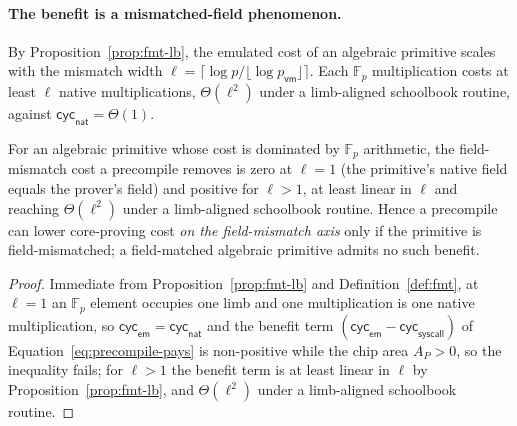 \paragraph{The benefit is a mismatched-field phenomenon.} By Proposition~\ref{prop:fmt-lb}, the emulated cost of an algebraic primitive scales with the mismatch width $\ell=\lceil\log p/\lfloor\log p_{\mathsf{vm}}\rfloor\rceil$. Each $\mathbb{F}_p$ multiplication costs at least $\ell$ native multiplications, $\Theta(\ell^2)$ under a limb-aligned schoolbook routine, against $\mathsf{cyc}_{\mathsf{nat}}=\Theta(1)$.

\begin{proposition}\label{prop:field-match}
For an algebraic primitive whose cost is dominated by $\mathbb{F}_p$ arithmetic, the field-mismatch cost a precompile removes is zero at $\ell=1$ (the primitive's native field equals the prover's field) and positive for $\ell>1$, at least linear in $\ell$ and reaching $\Theta(\ell^2)$ under a limb-aligned schoolbook routine. Hence a precompile can lower core-proving cost \emph{on the field-mismatch axis} only if the primitive is field-mismatched; a field-matched algebraic primitive admits no such benefit.
\end{proposition}

\begin{proof} 
Immediate from Proposition~\ref{prop:fmt-lb} and Definition~\ref{def:fmt}, at $\ell=1$ an $\mathbb{F}_p$ element occupies one limb and one multiplication is one native multiplication, so $\mathsf{cyc}_{\mathsf{em}}=\mathsf{cyc}_{\mathsf{nat}}$ and the benefit term $(\mathsf{cyc}_{\mathsf{em}}-\mathsf{cyc}_{\mathsf{syscall}})$ of Equation~\eqref{eq:precompile-pays} is non-positive while the chip area $A_P>0$, so the inequality fails; for $\ell>1$ the benefit term is at least linear in $\ell$ by Proposition~\ref{prop:fmt-lb}, and $\Theta(\ell^2)$ under a limb-aligned schoolbook routine.
\end{proof}

